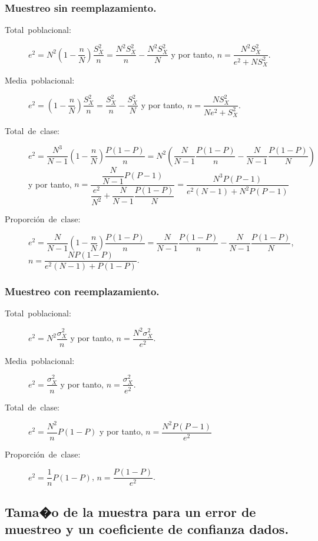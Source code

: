\subsubsection{Muestreo sin reemplazamiento.}
\begin{description}
\item [{Total~poblacional:}] $e^{2}=N^{2}\left(1-\dfrac{n}{N}\right)\dfrac{S_{X}^{2}}{n}=\dfrac{N^{2}S_{X}^{2}}{n}-\dfrac{N^{2}S_{X}^{2}}{N}$
y por tanto, $n=\dfrac{N^{2}S_{X}^{2}}{e^{2}+NS_{X}^{2}}$.
\item [{Media~poblacional:}] $e^{2}=\left(1-\dfrac{n}{N}\right)\dfrac{S_{X}^{2}}{n}=\dfrac{S_{X}^{2}}{n}-\dfrac{S_{X}^{2}}{N}$
y por tanto, $n=\dfrac{NS_{X}^{2}}{Ne^{2}+S_{X}^{2}}$.
\item [{Total~de~clase:}] $e^{2}=\dfrac{N^{3}}{N-1}\left(1-\dfrac{n}{N}\right)\dfrac{P\left(1-P\right)}{n}=N^{2}\left(\dfrac{N}{N-1}\dfrac{P\left(1-P\right)}{n}-\dfrac{N}{N-1}\dfrac{P\left(1-P\right)}{N}\right)$
y por tanto, $n=\dfrac{\dfrac{N}{N-1}P\left(P-1\right)}{\dfrac{e^{2}}{N^{2}}+\dfrac{N}{N-1}\dfrac{P\left(1-P\right)}{N}}=\dfrac{N^{3}P\left(P-1\right)}{e^{2}\left(N-1\right)+N^{2}P\left(P-1\right)}$
\item [{Proporci\'on~de~clase:}] $e^{2}=\dfrac{N}{N-1}\left(1-\dfrac{n}{N}\right)\dfrac{P\left(1-P\right)}{n}=\dfrac{N}{N-1}\dfrac{P\left(1-P\right)}{n}-\dfrac{N}{N-1}\dfrac{P\left(1-P\right)}{N}$,
$n=\dfrac{NP(1-P)}{e^{2}\left(N-1\right)+P(1-P)}$.
\end{description}

\subsubsection{Muestreo con reemplazamiento.}
\begin{description}
\item [{Total~poblacional:}] $e^{2}=N^{2}\dfrac{\sigma_{X}^{2}}{n}$ y
por tanto, $n=\dfrac{N^{2}\sigma_{X}^{2}}{e^{2}}$.
\item [{Media~poblacional:}] $e^{2}=\dfrac{\sigma_{X}^{2}}{n}$ y por
tanto, $n=\dfrac{\sigma_{X}^{2}}{e^{2}}$.
\item [{Total~de~clase:}] $e^{2}=\dfrac{N^{2}}{n}P(1-P)$ y por tanto,
$n=\dfrac{N^{2}P\left(P-1\right)}{e^{2}}$
\item [{Proporci\'on~de~clase:}] $e^{2}=\dfrac{1}{n}P(1-P)$, $n=\dfrac{P(1-P)}{e^{2}}$.
\end{description}

\subsection{Tama�o de la muestra para un error de muestreo y un coeficiente de
confianza dados.}

